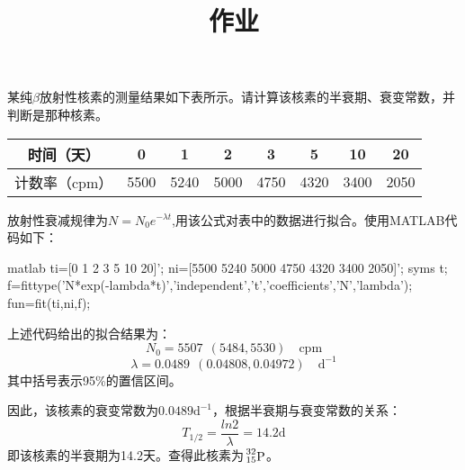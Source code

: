 

\duedate{\today}



\title{\vspace{-1cm}作业\vspace{-1.5cm}}
\date{}
\inlinemaketitle


\begin{problem}[1]
某纯$\beta$放射性核素的测量结果如下表所示。请计算该核素的半衰期、衰变常数，并判断是那种核素。

    \begin{table}[H]
    \centering
    \label{表格}
    \begin{tabular}{|c|c|c|c|c|c|c|c|}
    \hline
    时间（天） & 0 & 1 & 2 & 3 & 5 & 10 & 20 \\
    \hline
    计数率（cpm） & 5500 & 5240 & 5000 & 4750 & 4320 & 3400 & 2050 \\
    \hline
    \end{tabular}
    \end{table}

\end{problem}

\begin{solution}
  \par
  放射性衰减规律为$N=N_0 e^{-\lambda t}$,用该公式对表中的数据进行拟合。使用MATLAB代码如下：
  \par
\begin{myminted}{matlab}
ti=[0 1 2 3 5 10 20]';
ni=[5500 5240 5000 4750 4320 3400 2050]';
syms t;
f=fittype('N*exp(-lambda*t)','independent','t','coefficients',{'N','lambda'});
fun=fit(ti,ni,f);
\end{myminted}
  \par
  上述代码给出的拟合结果为：
  \[N_0=5507\ \ (5484, 5530) \quad \text{cpm}\]
  \[\lambda = 0.0489\ \ (0.04808, 0.04972) \quad \text{d}^{-1}\]
  其中括号表示95\%的置信区间。
  \par
  因此，该核素的衰变常数为$0.0489 \text{d}^{-1}$，根据半衰期与衰变常数的关系：
  \[T_{1/2}=\frac{ln2}{\lambda}=14.2  \text{d}\]
  即该核素的半衰期为14.2天。查得此核素为$\sideset{^{32}_{15}}{}{\mathop{\mathrm{P}}}$。
\end{solution}

